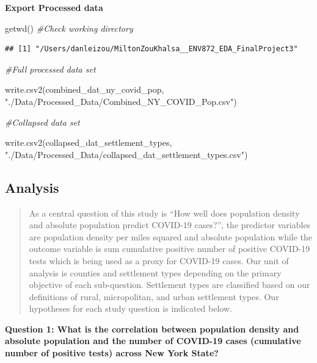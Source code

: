 \documentclass[
  12pt,
]{article}
\newenvironment{Shaded}{\begin{snugshade}}{\end{snugshade}}
\newcommand{\CommentTok}[1]{\textcolor[rgb]{0.56,0.35,0.01}{\textit{#1}}}
\newcommand{\FunctionTok}[1]{\textcolor[rgb]{0.00,0.00,0.00}{#1}}
\newcommand{\NormalTok}[1]{#1}
\newcommand{\StringTok}[1]{\textcolor[rgb]{0.31,0.60,0.02}{#1}}
\begin{document}
\textbf{Export Processed data}

\begin{Shaded}
\begin{Highlighting}[]
\FunctionTok{getwd}\NormalTok{() }\CommentTok{\#Check working directory}
\end{Highlighting}
\end{Shaded}

\begin{verbatim}
## [1] "/Users/danleizou/MiltonZouKhalsa__ENV872_EDA_FinalProject3"
\end{verbatim}

\begin{Shaded}
\begin{Highlighting}[]
\CommentTok{\#Full processed data set}

\FunctionTok{write.csv2}\NormalTok{(combined\_dat\_ny\_covid\_pop,}
           \StringTok{"./Data/Processed\_Data/Combined\_NY\_COVID\_Pop.csv"}\NormalTok{)}

\CommentTok{\#Collapsed data set}

\FunctionTok{write.csv2}\NormalTok{(collapsed\_dat\_settlement\_types,}
           \StringTok{"./Data/Processed\_Data/collapsed\_dat\_settlement\_types.csv"}\NormalTok{)}
\end{Highlighting}
\end{Shaded}

\newpage

\hypertarget{analysis}{%
\subsection{Analysis}\label{analysis}}

\begin{quote}
As a central question of this study is ``How well does population
density and absolute population predict COVID-19 cases?'', the predictor
variables are population density per miles squared and absolute
population while the outcome variable is sum cumulative positive number
of positive COVID-19 tests which is being used as a proxy for COVID-19
cases. Our unit of analysis is counties and settlement types depending
on the primary objective of each sub-question. Settlement types are
classified based on our definitions of rural, micropolitan, and urban
settlement types. Our hypotheses for each study question is indicated
below.
\end{quote}

\textbf{Question 1: What is the correlation between population density
and absolute population and the number of COVID-19 cases (cumulative
number of positive tests) across New York State?}
\end{document}

